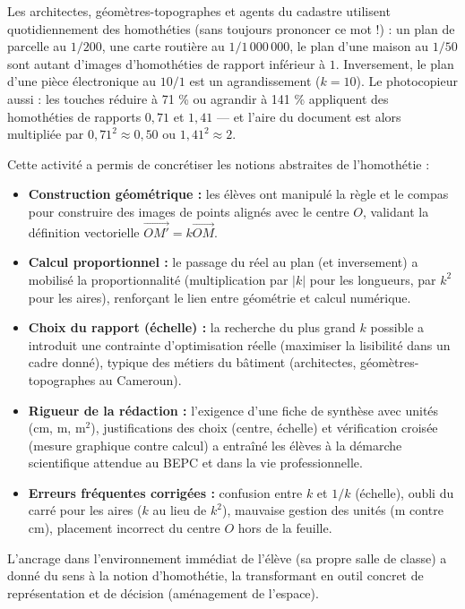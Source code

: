 \documentclass[11pt]{article}
\newcounter{popsec}
\newcounter{popsub}
\newcommand{\courssub}[1]{%
  \stepcounter{popsub}%
  \par\vspace{9pt}\noindent{\popxbold\fontsize{11.5}{13}\selectfont\color{popink}{\color{poporange}\thepopsec.\thepopsub}\hspace{6pt}#1}\par\nopagebreak\vspace{4pt}
}
\begin{document}
\begin{savaistu}
Les architectes, géomètres-topographes et agents du cadastre utilisent quotidiennement des homothéties (sans toujours prononcer ce mot !) : un plan de parcelle au $1/200$, une carte routière au $1/1\,000\,000$, le plan d'une maison au $1/50$ sont autant d'images d'homothéties de rapport inférieur à $1$. Inversement, le plan d'une pièce électronique au $10/1$ est un agrandissement ($k = 10$). Le photocopieur aussi : les touches \og réduire à 71 \% \fg{} ou \og agrandir à 141 \% \fg{} appliquent des homothéties de rapports $0,71$ et $1,41$ — et l'aire du document est alors multipliée par $0,71^2 \approx 0,50$ ou $1,41^2 \approx 2$.
\end{savaistu}

\courssub{Bilan de l'activité}
Cette activité a permis de concrétiser les notions abstraites de l'homothétie :
\begin{itemize}
    \item \textbf{Construction géométrique :} les élèves ont manipulé la règle et le compas pour construire des images de points alignés avec le centre $O$, validant la définition vectorielle $\overrightarrow{OM'} = k \overrightarrow{OM}$.
    \item \textbf{Calcul proportionnel :} le passage du réel au plan (et inversement) a mobilisé la proportionnalité (multiplication par $|k|$ pour les longueurs, par $k^2$ pour les aires), renforçant le lien entre géométrie et calcul numérique.
    \item \textbf{Choix du rapport (échelle) :} la recherche du \og plus grand $k$ possible \fg{} a introduit une contrainte d'optimisation réelle (maximiser la lisibilité dans un cadre donné), typique des métiers du bâtiment (architectes, géomètres-topographes au Cameroun).
    \item \textbf{Rigueur de la rédaction :} l'exigence d'une fiche de synthèse avec unités (cm, m, m$^2$), justifications des choix (centre, échelle) et vérification croisée (mesure graphique contre calcul) a entraîné les élèves à la démarche scientifique attendue au BEPC et dans la vie professionnelle.
    \item \textbf{Erreurs fréquentes corrigées :} confusion entre $k$ et $1/k$ (échelle), oubli du carré pour les aires ($k$ au lieu de $k^2$), mauvaise gestion des unités (m contre cm), placement incorrect du centre $O$ hors de la feuille.
\end{itemize}
\par L'ancrage dans l'environnement immédiat de l'élève (sa propre salle de classe) a donné du sens à la notion d'homothétie, la transformant en outil concret de représentation et de décision (aménagement de l'espace).
\end{document}
